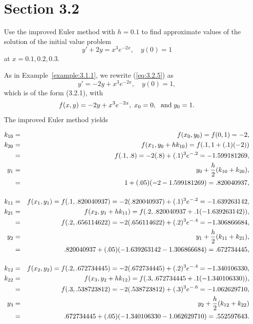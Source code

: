 \section*{Section 3.2}
\setcounter{chapter}{3}
\setcounter{section}{2}

\setcounter{example}{0}
\setcounter{equation}{4}
\begin{example}
  \label{example:3.2.1} \rm Use the improved Euler method with $h=0.1$ to find approximate values of
  the solution of the initial value problem
  \begin{equation}
    \label{eq:3.2.5}y'+2y=x^{3}e^{-2x},\quad y(0)=1
  \end{equation}
  at $x=0.1,0.2,0.3$.
\end{example}
\begin{examplesolution}
\solution As in Example~\ref{example:3.1.1}, we rewrite (\ref{eq:3.2.5}) as
\[
  y'=-2y+x^{3}e^{-2x},\quad y(0)=1,
\]
which is of the form (3.2.1), with
\[
  f(x,y)=-2y+x^{3}e^{-2x},\;x_{0}=0,\mbox{\; and}\;y_{0}=1.
\]
The improved Euler method yields

\begin{eqnarray*}
  k_{10} & = & f(x_{0},y_{0})=f(0,1)=-2,                                                    \\
  k_{20} & = & f(x_{1},y_{0}+hk_{10})=f(.1,1+(.1)(-2))                                      \\
         & = & f(.1,.8)=-2(.8)+(.1)^{3}e^{-.2}=-1.599181269,                                \\
  y_{1}  & = & y_{0}+\frac{h}{2}(k_{10}+k_{20}),                                            \\
         & = & 1+(.05)(-2-1.599181269)=.820040937,                                          \\[4\jot]
  k_{11} & = & f(x_{1},y_{1})=f(.1,.820040937)=-2(.820040937)+(.1)^{3}e^{-.2}=-1.639263142, \\
  k_{21} & = & f(x_{2},y_{1}+hk_{11})=f(.2,.820040937+.1(-1.639263142)),                    \\
         & = & f(.2,.656114622)=-2(.656114622)+(.2)^{3}e^{-.4}=-1.306866684,                \\
  y_{2}  & = & y_{1}+\frac{h}{2}(k_{11}+k_{21}),                                            \\
         & = & .820040937+(.05)(-1.639263142-1.306866684)=.672734445,                       \\[4\jot]
  k_{12} & = & f(x_{2},y_{2})=f(.2,.672734445)=-2(.672734445)+(.2)^{3}e^{-.4}=-1.340106330, \\
  k_{22} & = & f(x_{3},y_{2}+hk_{12})=f(.3,.672734445+.1(-1.340106330)),                    \\
         & = & f(.3,.538723812)=-2(.538723812)+(.3)^{3}e^{-.6}=-1.062629710,                \\
  y_{3}  & = & y_{2}+\frac{h}{2}(k_{12}+k_{22})                                             \\
         & = & .672734445+(.05)(-1.340106330-1.062629710)=.552597643.
\end{eqnarray*}
\end{examplesolution}


